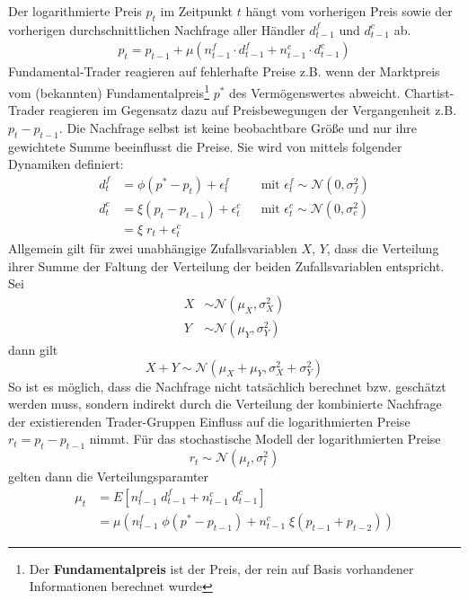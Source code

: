 \documentclass[ngerman]{ttlab-qualify}
\begin{document}
Der logarithmierte Preis $p_t$ im Zeitpunkt $t$ hängt vom vorherigen Preis sowie der vorherigen durchschnittlichen Nachfrage aller Händler $d_{t-1}^f$ und $d_{t-1}^c$ ab. 
\begin{align}
p_t = p_{t-1} + \mu (n_{t-1}^f\cdot d_{t-1}^f + n_{t-1}^c\cdot d_{t-1}^c)
\end{align}
Fundamental-Trader reagieren auf fehlerhafte Preise z.B. wenn der Marktpreis vom (bekannten) Fundamentalpreis\footnote{Der \textbf{Fundamentalpreis} ist der Preis, der rein auf Basis vorhandener Informationen berechnet wurde} $p^*$ des Vermögenswertes abweicht. Chartist-Trader reagieren im Gegensatz dazu auf Preisbewegungen der Vergangenheit z.B. $p_t-p_{t-1}$.
Die Nachfrage selbst ist keine beobachtbare Größe und nur ihre gewichtete Summe beeinflusst die Preise. Sie wird von \parencite{bertschinger:2018,FW:2011} mittels folgender Dynamiken definiert:
\begin{align}
d_t^f &= \phi (p^*-p_t)+\epsilon_t^f & &\text{mit }\epsilon_t^f\sim \mathcal{N}(0,\sigma^2_f)\nonumber \\
d_t^c &= \xi (p_t-p_{t-1})+\epsilon_t^c & &\text{mit }\epsilon_t^c\sim \mathcal{N}(0,\sigma^2_c)\nonumber \\
&=\xi \; r_t +\epsilon_t^c \nonumber
\end{align}
Allgemein gilt für zwei unabhängige Zufallsvariablen $X$, $Y$, dass die Verteilung ihrer Summe der Faltung der Verteilung der beiden Zufallsvariablen entspricht.\\
Sei
\begin{align}
X&\sim \mathcal{N}(\mu_X, \sigma_X^2)\nonumber \\
Y&\sim \mathcal{N}(\mu_Y,\sigma_Y^2)\nonumber
\end{align}
dann gilt
\[X+Y\sim\mathcal{N}(\mu_X+\mu_Y,\sigma_X^2+\sigma_Y^2)\]
So ist es möglich, dass die Nachfrage nicht tatsächlich berechnet bzw. geschätzt werden muss, sondern indirekt durch die Verteilung der kombinierte Nachfrage der existierenden Trader-Gruppen Einfluss auf die logarithmierten Preise $r_t = p_t-p_{t-1}$ nimmt.
Für das stochastische Modell der logarithmierten Preise 
\[r_t\sim\mathcal{N}(\mu_t,\sigma_t^2)\]
gelten dann die Verteilungsparamter
\begin{align}
\mu_t&= E[n_{t-1}^f\; d_{t-1}^f + n_{t-1}^c\; d_{t-1}^c]\nonumber\\
&=\mu (n_{t-1}^f\; \phi(p^*-p_{t-1}) +n_{t-1}^c\; \xi (p_{t-1}+p_{t-2}))
\end{align}
\end{document}
